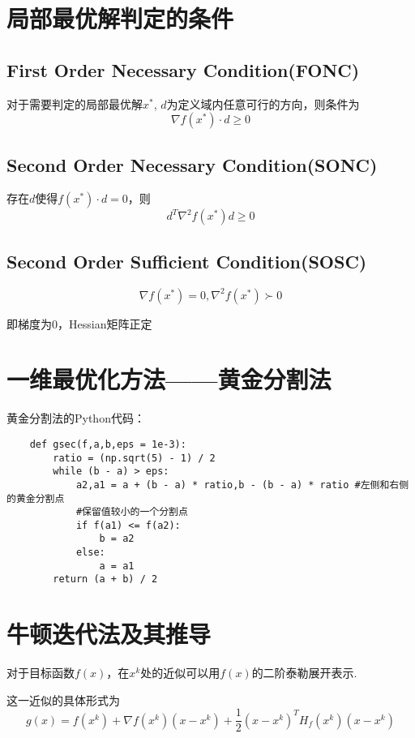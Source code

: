 \documentclass{article}
\begin{document}
\section{局部最优解判定的条件}
\subsection{First Order Necessary Condition(FONC)}
对于需要判定的局部最优解$x^*$, $d$为定义域内任意可行的方向，则条件为
\begin{equation*}
    \nabla f(x^*)\cdot d \geq 0
\end{equation*}
\subsection{Second Order Necessary Condition(SONC)}
存在$d$使得$f(x^*)\cdot d=0$，则
\begin{equation*}
    d^T\nabla^2f(x^*)d \geq 0
\end{equation*}
\subsection{Second Order Sufficient Condition(SOSC)}
\begin{equation*}
    \nabla f(x^*)=0,\nabla^2f(x^*)\succ 0
\end{equation*}

即梯度为0，Hessian矩阵正定
\section{一维最优化方法——黄金分割法}
黄金分割法的Python代码：
\begin{verbatim}
    def gsec(f,a,b,eps = 1e-3):
        ratio = (np.sqrt(5) - 1) / 2
        while (b - a) > eps:
            a2,a1 = a + (b - a) * ratio,b - (b - a) * ratio #左侧和右侧的黄金分割点
            #保留值较小的一个分割点
            if f(a1) <= f(a2): 
                b = a2
            else:
                a = a1
        return (a + b) / 2
\end{verbatim}

\section{牛顿迭代法及其推导}
对于目标函数$f(x)$，在$x^k$处的近似可以用$f(x)$的二阶泰勒展开表示.

这一近似的具体形式为
\begin{equation*}
    g(x)=f(x^k)+\nabla f(x^k)(x-x^k)+\frac{1}{2}(x-x^k)^TH_f(x^k)(x-x^k)
\end{equation*}
\end{document}
